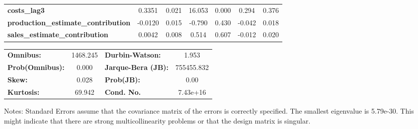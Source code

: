 \begin{center}
\begin{tabular}{lcccccc}
\textbf{costs\_lag3}                        &       0.3351  &        0.021     &    16.053  &         0.000        &        0.294    &        0.376     \\
\textbf{production\_estimate\_contribution} &      -0.0120  &        0.015     &    -0.790  &         0.430        &       -0.042    &        0.018     \\
\textbf{sales\_estimate\_contribution}      &       0.0042  &        0.008     &     0.514  &         0.607        &       -0.012    &        0.020     \\
\bottomrule
\end{tabular}
\begin{tabular}{lclc}
\textbf{Omnibus:}       & 1468.245 & \textbf{  Durbin-Watson:     } &     1.953   \\
\textbf{Prob(Omnibus):} &   0.000  & \textbf{  Jarque-Bera (JB):  } & 755455.832  \\
\textbf{Skew:}          &   0.028  & \textbf{  Prob(JB):          } &      0.00   \\
\textbf{Kurtosis:}      &  69.942  & \textbf{  Cond. No.          } &  7.43e+16   \\
\bottomrule
\end{tabular}
\end{center}

Notes: \newline
 [1] Standard Errors assume that the covariance matrix of the errors is correctly specified. \newline
 [2] The smallest eigenvalue is 5.79e-30. This might indicate that there are \newline
 strong multicollinearity problems or that the design matrix is singular.